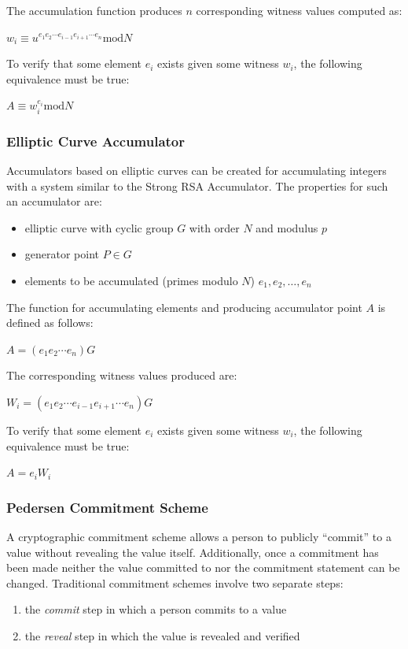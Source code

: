 \documentclass[11pt]{article}
\begin{document}
The accumulation function produces $n$ corresponding witness values computed as:
\begin{center}
    $w_i \equiv u^{e_1 e_2 \cdots e_{i-1} e_{i+1} \cdots e_n} \textrm{mod} N$
\end{center}

To verify that some element $e_i$ exists given some witness $w_i$, the following equivalence must be true:
\begin{center}
    $A \equiv w_i^{e_i} \textrm{mod} N$
\end{center}

\subsubsection{Elliptic Curve Accumulator}
Accumulators based on elliptic curves can be created for accumulating integers with a system similar to the Strong RSA
Accumulator. The properties for such an accumulator are:
\begin{itemize}
    \item elliptic curve with cyclic group $G$ with order $N$ and modulus $p$
    \item generator point $P \in G$ 
    \item elements to be accumulated (primes modulo $N$) $e_1, e_2, \ldots, e_n$
\end{itemize}

The function for accumulating elements and producing accumulator point $A$ is defined as follows:
\begin{center}
    $A = (e_1 e_2 \cdots e_n) G$
\end{center}

The corresponding witness values produced are:
\begin{center}
    $W_i = (e_1 e_2 \cdots e_{i-1} e_{i+1} \cdots e_n) G$
\end{center}

To verify that some element $e_i$ exists given some witness $w_i$, the following equivalence must be true:
\begin{center}
    $A = e_i W_i$
\end{center}

\subsubsection{Pedersen Commitment Scheme}
A cryptographic commitment scheme allows a person to publicly ``commit'' to a value without revealing the value itself.
Additionally, once a commitment has been made neither the value committed to nor the commitment statement can be
changed. Traditional commitment schemes involve two separate steps:
\begin{enumerate}
    \item the \emph{commit} step in which a person commits to a value
    \item the \emph{reveal} step in which the value is revealed and verified
\end{enumerate}
\end{document}
